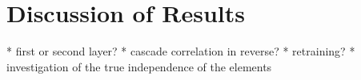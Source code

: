 \section{Discussion of Results}

 * first or second layer?
 * cascade correlation in reverse?
 * retraining?
 * investigation of the true independence of the elements
